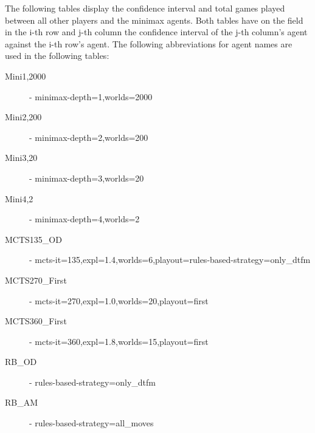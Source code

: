 The following tables display the confidence interval and total games played between all other players and the minimax agents. Both tables have on the field in the i-th row
and j-th column the confidence interval of the j-th column's agent against the i-th row's agent. The following abbreviations for agent names are used in the following tables:
\begin{description}
    \item[Mini1,2000] - minimax-depth=1,worlds=2000
    \item[Mini2,200] - minimax-depth=2,worlds=200
    \item[Mini3,20] - minimax-depth=3,worlds=20
    \item[Mini4,2] - minimax-depth=4,worlds=2
    \item[MCTS135\_OD] - mcts-it=135,expl=1.4,worlds=6,playout=rules-based-strategy=only\_dtfm
    \item[MCTS270\_First] - mcts-it=270,expl=1.0,worlds=20,playout=first
    \item[MCTS360\_First] - mcts-it=360,expl=1.8,worlds=15,playout=first
    \item[RB\_OD] - rules-based-strategy=only\_dtfm
    \item[RB\_AM] - rules-based-strategy=all\_moves
\end{description}

\renewcommand{\arraystretch}{0.7} %

